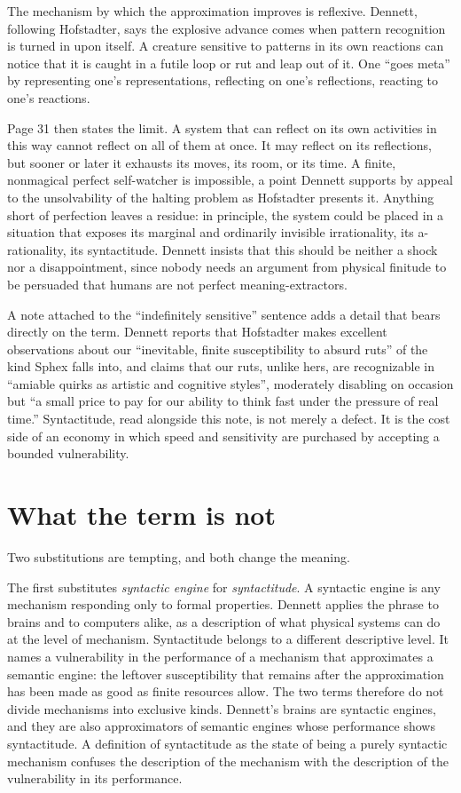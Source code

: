 \documentclass[11pt]{article}
\begin{document}
The mechanism by which the approximation improves is reflexive. Dennett, following Hofstadter, says the explosive advance comes when pattern recognition is turned in upon itself. A creature sensitive to patterns in its own reactions can notice that it is caught in a futile loop or rut and leap out of it. One ``goes meta'' by representing one's representations, reflecting on one's reflections, reacting to one's reactions.

Page 31 then states the limit. A system that can reflect on its own activities in this way cannot reflect on all of them at once. It may reflect on its reflections, but sooner or later it exhausts its moves, its room, or its time. A finite, nonmagical perfect self-watcher is impossible, a point Dennett supports by appeal to the unsolvability of the halting problem as Hofstadter presents it. Anything short of perfection leaves a residue: in principle, the system could be placed in a situation that exposes its marginal and ordinarily invisible irrationality, its a-rationality, its syntactitude. Dennett insists that this should be neither a shock nor a disappointment, since nobody needs an argument from physical finitude to be persuaded that humans are not perfect meaning-extractors.

A note attached to the ``indefinitely sensitive'' sentence adds a detail that bears directly on the term. Dennett reports that Hofstadter makes excellent observations about our ``inevitable, finite susceptibility to absurd ruts'' of the kind Sphex falls into, and claims that our ruts, unlike hers, are recognizable in ``amiable quirks as artistic and cognitive styles'', moderately disabling on occasion but ``a small price to pay for our ability to think fast under the pressure of real time.'' Syntactitude, read alongside this note, is not merely a defect. It is the cost side of an economy in which speed and sensitivity are purchased by accepting a bounded vulnerability.

\section{What the term is not}

Two substitutions are tempting, and both change the meaning.

The first substitutes \emph{syntactic engine} for \emph{syntactitude}. A syntactic engine is any mechanism responding only to formal properties. Dennett applies the phrase to brains and to computers alike, as a description of what physical systems can do at the level of mechanism. Syntactitude belongs to a different descriptive level. It names a vulnerability in the performance of a mechanism that approximates a semantic engine: the leftover susceptibility that remains after the approximation has been made as good as finite resources allow. The two terms therefore do not divide mechanisms into exclusive kinds. Dennett's brains are syntactic engines, and they are also approximators of semantic engines whose performance shows syntactitude. A definition of syntactitude as the state of being a purely syntactic mechanism confuses the description of the mechanism with the description of the vulnerability in its performance.
\end{document}
